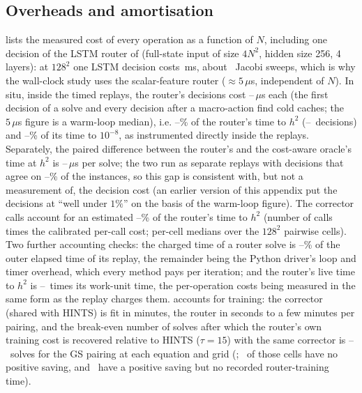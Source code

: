 \subsection{Overheads and amortisation} \label{sec:wallclock_overheads}

 lists the measured cost of every operation as a function of $N$, including one decision of the LSTM router of  (full-state input of size $4N^2$, hidden size 256, 4 layers): at $128^2$ one LSTM decision costs \caLstmMs\,ms, about \caLstmOverJacobi\ Jacobi sweeps, which is why the wall-clock study uses the scalar-feature router ($\approx 5\,\mu$s, independent of $N$). In situ, inside the timed replays, the router's decisions cost \caDecInSituMin--\caDecInSituMax\,$\mu$s each (the first decision of a solve and every decision after a macro-action find cold caches; the $5\,\mu$s figure is a warm-loop median), i.e. \caDecFracMin--\caDecFracMax\% of the router's time to $h^2$ (\caNDecMin--\caNDecMax\ decisions) and \caDecFracDeepMin--\caDecFracDeepMax\% of its time to $10^{-8}$, as instrumented directly inside the replays. Separately, the paired difference between the router's and the cost-aware oracle's time at $h^2$ is \caRouterOracleGapMin--\caRouterOracleGapMax\,$\mu$s per solve; the two run as separate replays with decisions that agree on \caAgreeOracleMin--\caAgreeOracleMax\% of the instances, so this gap is consistent with, but not a measurement of, the decision cost (an earlier version of this appendix put the decisions at ``well under $1\%$'' on the basis of the warm-loop figure). The corrector calls account for an estimated \caNoFracMin--\caNoFracMax\% of the router's time to $h^2$ (number of calls times the calibrated per-call cost; per-cell medians over the $128^2$ pairwise cells). Two further accounting checks: the charged time of a router solve is \caChargedFracMin--\caChargedFracMax\% of the outer elapsed time of its replay, the remainder being the Python driver's loop and timer overhead, which every method pays per iteration; and the router's live time to $h^2$ is \caLiveWuMin--\caLiveWuMax\ times its work-unit time, the per-operation costs being measured in the same form as the replay charges them.  accounts for training: the corrector (shared with HINTS) is fit in minutes, the router in seconds to a few minutes per pairing, and the break-even number of solves after which the router's own training cost is recovered relative to HINTS ($\tau{=}15$) with the same corrector is \caBreakEvenMin--\caBreakEvenMax\ solves for the GS pairing at each equation and grid (; \caBreakEvenNone\ of those cells have no positive saving, and \caBreakEvenNoTrain\ have a positive saving but no recorded router-training time).

